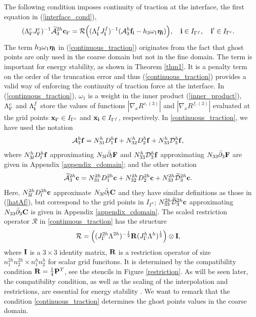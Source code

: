 The following condition imposes continuity of traction at the interface, the first equation in (\ref{interface_cond}),
\begin{equation}\label{continuous_traction}
(\Lambda^{c}_{{\bf i}'}J_{{\bf i}'}^{c})^{-1}\wt{\mathcal{A}}_3^{2h}{\bf c}_{{\bf i}'}
= {\mathcal{R}}\Big((\Lambda^f_{\bf i}{ J}^f_{\bf i})^{-1}(\mathcal{A}_3^h{\bf f}_{\bf i}-h_3\omega_1{\bm \eta}_{\bf i})\Big), \quad {\bf i}\in I_{\Gamma^f},\quad {{\bf i}'}\in I_{\Gamma^c}.
\end{equation}
The term $h_3\omega_1{\bm \eta}_{\bf i}$ in (\ref{continuous_traction}) originates from the fact that ghost points are only used in the coarse domain but not in the fine domain. The term is important for energy stability, as shown in Theorem \ref{thm1}. It is a penalty term on the order of the truncation error and thus (\ref{continuous_traction})  provides a valid way of enforcing the continuity of traction force at the interface.  In (\ref{continuous_traction}), $\omega_1$ is a weight in the inner product (\ref{inner_product}), $\Lambda_{{\bf i}'}^c$ and $\Lambda_{\bf i}^f$ store the values of functions $|\nabla_x R^{c,(3)}|$ and $|\nabla_x R^{f,(3)}|$ evaluated at the grid points ${\bf x}_{{\bf i}'}\in I_{\Gamma^c}$ and ${\bf x}_{\bf i}\in I_{\Gamma^f}$, respectively. In \eqref{continuous_traction}, we have used the notation
\begin{equation}\label{hatAf}
\mathcal{A}_3^h{\bf f} = {N}_{31}^{h}{D}^h_1{\bf f} + {N}_{32}^h{D}^h_2{\bf f} + {N}_{33}^h\mathcal{D}_3^h{\bf f},
\end{equation}
where ${N}_{3l}^hD_l^h{\bf f}$ approximating $N_{3l}\bar{\partial}_l{\bf F}$ and ${N}_{33}^h\mathcal{D}_3^h{\bf f}$ approximating $N_{33}\bar{\partial}_3{\bf F}$ are given in Appendix \ref{appendix_cdomain}; and the other notation 
\begin{equation}\label{hatAc}
\wt{\mathcal{A}}_3^{2h}{\bf c} = {N}_{31}^{2h}{D}^{2h}_1{\bf c} + {N}_{32}^{2h}{D}^{2h}_2{\bf c} + {N}_{33}^{2h}\wt{\mathcal{D}}^{2h}_3{\bf c}.
\end{equation}
Here, ${N}_{3l}^{2h}D_l^{2h}{\bf c}$ approximate $N_{3l}\bar{\partial}_l{\bf C}$ and they have similar definitions as those in (\ref{hatAf}), but correspond to the grid points in $I_{\Gamma^c}$; ${N}_{33}^{2h}\widetilde{\mathcal{D}}^{2h}_3{\bf c}$ approximating $N_{33}\bar{\partial}_3{\bf C}$ is given in Appendix \ref{appendix_cdomain}. The scaled restriction operator ${\mathcal{R}} $ in \eqref{continuous_traction} has the structure 
 \[{\mathcal{R}} =  \left(({J}^{2h}_\Gamma{\Lambda}^{2h})^{-\frac{1}{2}}{\bf R}({J}^{h}_\Gamma {\Lambda}^h)^{\frac{1}{2}}\right)\otimes {\bf I},\]
 where ${\bf I}$ is a $3\times3$ identity matrix, ${\bf R}$ is a restriction operator of size $n_1^{2h}n_2^{2h}\times n_1^hn_2^h$ for scalar grid funcitons. It is determined by the compatibility condition ${\bf R}=\frac{1}{4}{\bf P}^T$, see the stencils in Figure \ref{restriction}. As will be seen later, the compatibility condition, as well as the scaling of the interpolation and restrictions, are essential for energy stability \cite{Lundquist2018}. We want to remark that the condition \eqref{continuous_traction} determines the ghost points values in the coarse domain. 
 
